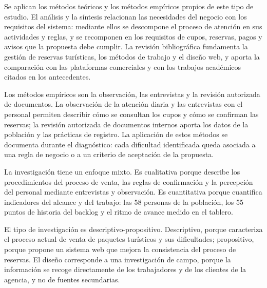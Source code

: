 \label{cap:metodos}

Se aplican los métodos teóricos y los métodos empíricos propios de este tipo
de estudio. El análisis y la síntesis relacionan las necesidades del negocio
con los requisitos del sistema: mediante ellos se descompone el proceso de
atención en sus actividades y reglas, y se recomponen en los requisitos de
cupos, reservas, pagos y avisos que la propuesta debe cumplir. La revisión
bibliográfica fundamenta la gestión de reservas turísticas, los métodos de
trabajo y el diseño web, y aporta la comparación con las plataformas
comerciales y con los trabajos académicos citados en los antecedentes.

Los métodos empíricos son la observación, las entrevistas y la revisión
autorizada de documentos. La observación de la atención diaria y las
entrevistas con el personal permiten describir cómo se consultan los cupos y
cómo se confirman las reservas; la revisión autorizada de documentos
internos aporta los datos de la población y las prácticas de registro. La
aplicación de estos métodos se documenta durante el diagnóstico: cada
dificultad identificada queda asociada a una regla de negocio o a un criterio
de aceptación de la propuesta.

La investigación tiene un enfoque mixto. Es cualitativa porque describe los
procedimientos del proceso de venta, las reglas de confirmación y la
percepción del personal mediante entrevistas y observación. Es cuantitativa
porque cuantifica indicadores del alcance y del trabajo: las 58 personas de
la población, los 55 puntos de historia del backlog y el ritmo de avance
medido en el tablero.

El tipo de investigación es descriptivo-propositivo. Descriptivo, porque
caracteriza el proceso actual de venta de paquetes turísticos y sus
dificultades; propositivo, porque propone un sistema web que mejora la
consistencia del proceso de reservas. El diseño corresponde a una
investigación de campo, porque la información se recoge directamente de los
trabajadores y de los clientes de la agencia, y no de fuentes secundarias.
